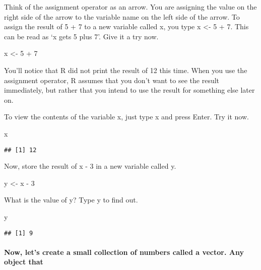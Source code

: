 \documentclass[
]{article}
\newenvironment{Shaded}{\begin{snugshade}}{\end{snugshade}}
\newcommand{\DecValTok}[1]{\textcolor[rgb]{0.00,0.00,0.81}{#1}}
\newcommand{\NormalTok}[1]{#1}
\newcommand{\OtherTok}[1]{\textcolor[rgb]{0.56,0.35,0.01}{#1}}
\newcommand{\SpecialCharTok}[1]{\textcolor[rgb]{0.00,0.00,0.00}{#1}}
\begin{document}
Think of the assignment operator as an arrow. You are assigning the
value on the right side of the arrow to the variable name on the left
side of the arrow. To assign the result of 5 + 7 to a new variable
called x, you type x \textless- 5 + 7. This can be read as `x gets 5
plus 7'. Give it a try now.

\begin{Shaded}
\begin{Highlighting}[]
\NormalTok{x }\OtherTok{\textless{}{-}} \DecValTok{5} \SpecialCharTok{+} \DecValTok{7}
\end{Highlighting}
\end{Shaded}

You'll notice that R did not print the result of 12 this time. When you
use the assignment operator, R assumes that you don't want to see the
result immediately, but rather that you intend to use the result for
something else later on.

To view the contents of the variable x, just type x and press Enter. Try
it now.

\begin{Shaded}
\begin{Highlighting}[]
\NormalTok{x}
\end{Highlighting}
\end{Shaded}

\begin{verbatim}
## [1] 12
\end{verbatim}

Now, store the result of x - 3 in a new variable called y.

\begin{Shaded}
\begin{Highlighting}[]
\NormalTok{y }\OtherTok{\textless{}{-}}\NormalTok{ x }\SpecialCharTok{{-}} \DecValTok{3}
\end{Highlighting}
\end{Shaded}

What is the value of y? Type y to find out.

\begin{Shaded}
\begin{Highlighting}[]
\NormalTok{y}
\end{Highlighting}
\end{Shaded}

\begin{verbatim}
## [1] 9
\end{verbatim}

\hypertarget{now-lets-create-a-small-collection-of-numbers-called-a-vector.-any-object-that}{%
\paragraph{Now, let's create a small collection of numbers called a
vector. Any object
that}\label{now-lets-create-a-small-collection-of-numbers-called-a-vector.-any-object-that}}
\end{document}
